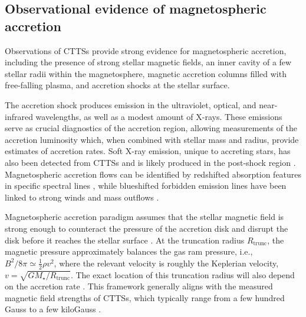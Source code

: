 \documentclass[12pt,a4paper]{article}
\newcommand{\mr}{\mathrm}
\begin{document}
\subsection{Observational evidence of magnetospheric accretion}
\label{sec:obs_evidence}

Observations of CTTSs provide strong evidence for magnetospheric accretion, including the presence of strong stellar magnetic fields, an inner cavity of a few stellar radii within the magnetosphere, magnetic accretion columns filled with free-falling plasma, and accretion shocks at the stellar surface.

The accretion shock produces emission in the ultraviolet, optical, and near-infrared wavelengths, as well as a modest amount of X-rays. These emissions serve as crucial diagnostics of the accretion region, allowing measurements of the accretion luminosity which, when combined with stellar mass and radius, provide estimates of accretion rates. Soft X-ray emission, unique to accreting stars, has also been detected from CTTSs and is likely produced in the post-shock region \parencite[e.g.,][]{KastnerEtAl2002}. Magnetospheric accretion flows can be identified by redshifted absorption features in specific spectral lines \parencite{MuzerolleEtAl2001}, while blueshifted forbidden emission lines have been linked to strong winds and mass outflows \parencite[e.g.,][]{Bally2016}.


Magnetospheric accretion paradigm assumes that the stellar magnetic field is strong enough to counteract the pressure of the accretion disk and disrupt the disk before it reaches the stellar surface \parencite[e.g.,][]{Koenigl1991}. At the truncation radius $R_\mr{trunc}$, the magnetic pressure approximately balances the gas ram pressure,  i.e., $B^2/8\pi \simeq \frac{1}{2}\rho v^2$, where the relevant velocity is roughly the Keplerian velocity, $v = \sqrt{GM_\star/R_\mr{trunc}}$. The exact location of this truncation radius will also depend on the accretion rate \parencite[see Eq.~2.2 in][]{BouvierEtAl2007}. This framework generally aligns with the measured magnetic field strengths of CTTSs, which typically range from a few hundred Gauss to a few kiloGauss \parencite{BouvierEtAl2007,AlencarEtAl2012}.
\end{document}
